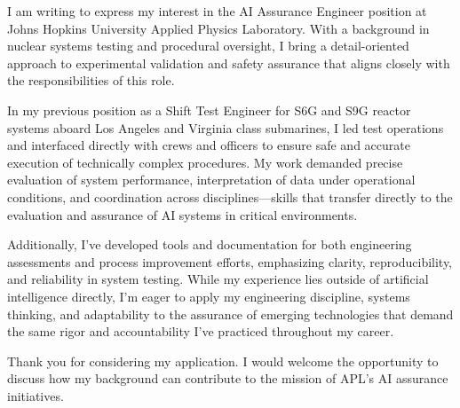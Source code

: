 I am writing to express my interest in the AI Assurance Engineer position at Johns Hopkins University Applied Physics Laboratory.
With a background in nuclear systems testing and procedural oversight, I bring a detail-oriented approach to experimental validation and safety assurance that aligns closely with the responsibilities of this role.

In my previous position as a Shift Test Engineer for S6G and S9G reactor systems aboard Los Angeles and Virginia class submarines, I led test operations and interfaced directly with crews and officers to ensure safe and accurate execution of technically complex procedures.
My work demanded precise evaluation of system performance, interpretation of data under operational conditions, and coordination across disciplines—skills that transfer directly to the evaluation and assurance of AI systems in critical environments.

Additionally, I’ve developed tools and documentation for both engineering assessments and process improvement efforts, emphasizing clarity, reproducibility, and reliability in system testing.
While my experience lies outside of artificial intelligence directly, I’m eager to apply my engineering discipline, systems thinking, and adaptability to the assurance of emerging technologies that demand the same rigor and accountability I’ve practiced throughout my career.

Thank you for considering my application.
I would welcome the opportunity to discuss how my background can contribute to the mission of APL’s AI assurance initiatives.

